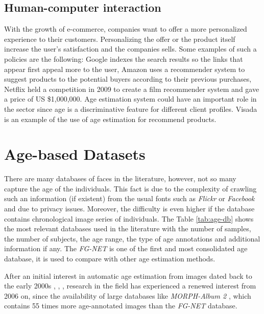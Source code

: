 \subsection{Human-computer interaction}
With the growth of e-commerce, companies want to offer a more personalized experience to their customers. Personalizing the offer or the product itself increase the user's satisfaction and the companies sells. Some examples of such a policies are the following: Google \cite{Brin:1998:ALH:297810.297827} indexes the search results so the links that appear first appeal more to the user, Amazon \cite{Linden:2003:ARI:642462.642471} uses a recommender system to suggest products to the potential buyers according to their previous purchases, Netflix \cite{Koren:2009:MFT:1608565.1608614} held a competition in 2009 to create a film recommender system and gave a price of US \$1,000,000. Age estimation system could have an important role in the sector since age is a discriminative feature for different client profiles. Visada \cite{visada} is an example of the use of age estimation for recommend products.


\section{Age-based Datasets} \label{sec:ageDB}
There are many databases of faces in the literature, however, not so many capture the age of the individuals. This fact is due to the complexity of crawling such an information (if existent) from the usual fonts such as \textit{Flickr} or \textit{Facebook} and due to privacy issues. Moreover, the difficulty is even higher if the database contains chronological image series of individuals. The Table \ref{tab:age-db} shows the most relevant databases used in the literature with the number of samples, the number of subjects, the age range, the type of age annotations and additional information if any. The \textit{FG-NET} \cite{993553} is one of the first and most consolidated age database, it is used to compare with other age estimation methods.

After an initial interest in automatic age estimation from images dated back to the early 2000s \cite{Lanitis:2004:CDC:2225304.2226166}, \cite{993553}, \cite{palDB}, research in the field has experienced a renewed interest from 2006 on, since the availability of large databases like \textit{MORPH-Album 2} \cite{1613043}, which contains 55 times more age-annotated images than the \textit{FG-NET} database.

